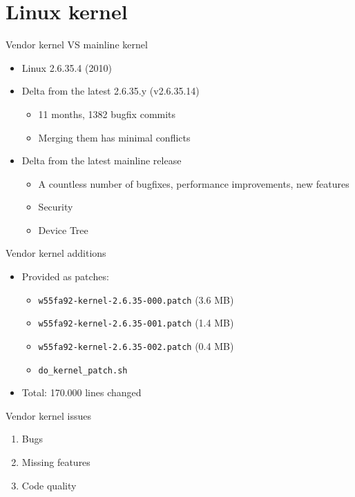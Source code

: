 \documentclass[xetex,table]{beamer}
\begin{document}
\section{Linux kernel}

\begin{frame}{Vendor kernel VS mainline kernel}
  \begin{itemize}
  \item Linux 2.6.35.4 (2010)
  \item Delta from the latest 2.6.35.y (v2.6.35.14)
    \begin{itemize}
    \item 11 months, 1382 bugfix commits
    \item Merging them has minimal conflicts
    \end{itemize}
  \item Delta from the latest mainline release
    \begin{itemize}
    \item A countless number of bugfixes, performance improvements, new features
    \item Security
    \item Device Tree
    \end{itemize}
  \end{itemize}
\end{frame}

\begin{frame}{Vendor kernel additions}
  \begin{itemize}
  \item Provided as patches:
    \begin{itemize}
    \item \texttt{w55fa92-kernel-2.6.35-000.patch} (3.6 MB)
    \item \texttt{w55fa92-kernel-2.6.35-001.patch} (1.4 MB)
    \item \texttt{w55fa92-kernel-2.6.35-002.patch} (0.4 MB)
    \item \texttt{do\_kernel\_patch.sh}
    \end{itemize}
  \item Total: 170.000 lines changed
  \end{itemize}
\end{frame}

\begin{frame}{Vendor kernel issues}
  \begin{enumerate}
  \item Bugs
  \item Missing features
  \item Code quality
  \end{enumerate}
\end{frame}
\end{document}
